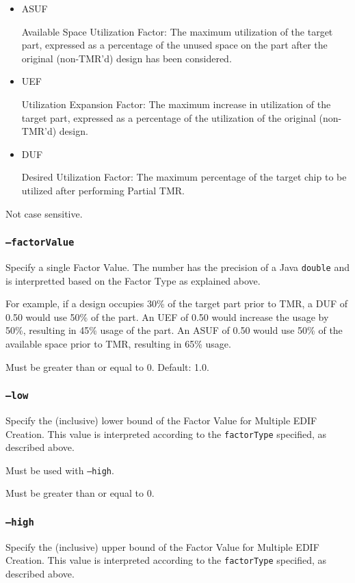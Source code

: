 \documentclass[english]{article}
\begin{document}
\begin{itemize}
\item ASUF 

Available Space Utilization Factor: The maximum utilization of the target part,
expressed as a percentage of the unused space on the part after the original
(non-TMR'd) design has been considered.

\item UEF 

Utilization Expansion Factor: The maximum increase in utilization of the target
part, expressed as a percentage of the utilization of the original (non-TMR'd)
design.

\item DUF 

Desired Utilization Factor: The maximum percentage of the target chip to be
utilized after performing Partial TMR.
\end{itemize}



Not case sensitive.

\subsubsection{\texttt{--factorValue}}
Specify a single Factor Value.  The number has the precision of a Java 
\texttt{double} and is interpretted based on the Factor Type as explained above.

For example, if a design occupies 30\% of the target part prior to TMR, a DUF
of 0.50 would use 50\% of the part. An UEF of 0.50 would increase the usage by
50\%, resulting in 45\% usage of the part. An ASUF of 0.50 would use 50\% of the
available space prior to TMR, resulting in 65\% usage.

Must be greater than or equal to 0. Default: 1.0.

\subsubsection{\texttt{--low}}
Specify the (inclusive) lower bound of the Factor Value for Multiple EDIF
Creation. This value is interpreted according to the \texttt{factorType}
specified, as described above.

Must be used with \texttt{--high}.

Must be greater than or equal to 0.

\subsubsection{\texttt{--high}}
Specify the (inclusive) upper bound of the Factor Value for Multiple EDIF
Creation. This value is interpreted according to the \texttt{factorType}
specified, as described above.
\end{document}
